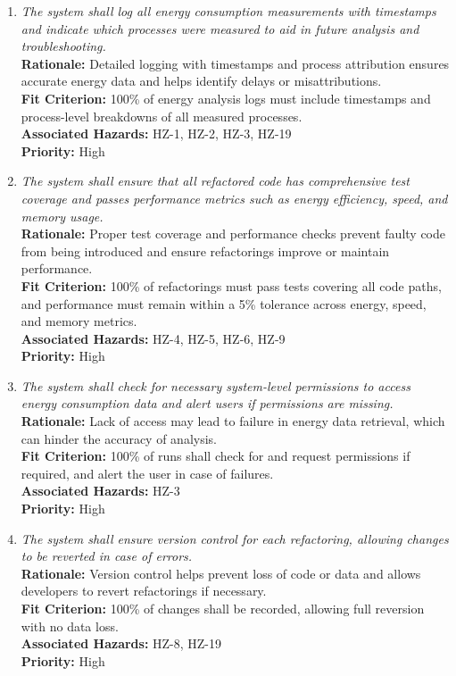 \documentclass{article}
\begin{document}
\begin{enumerate}[label=SCR \arabic*., wide=0pt, leftmargin=*]

    \item \emph{The system shall log all energy consumption measurements with timestamps and indicate which processes were measured to aid in future analysis and troubleshooting.}\\
    {\bf Rationale:} Detailed logging with timestamps and process attribution ensures accurate energy data and helps identify delays or misattributions.\\
    {\bf Fit Criterion:} 100\% of energy analysis logs must include timestamps and process-level breakdowns of all measured processes.\\
    {\bf Associated Hazards:} HZ-1, HZ-2, HZ-3, HZ-19\\
    {\bf Priority:} High

    \item \emph{The system shall ensure that all refactored code has comprehensive test coverage and passes performance metrics such as energy efficiency, speed, and memory usage.}\\
    {\bf Rationale:} Proper test coverage and performance checks prevent faulty code from being introduced and ensure refactorings improve or maintain performance.\\
    {\bf Fit Criterion:} 100\% of refactorings must pass tests covering all code paths, and performance must remain within a 5\% tolerance across energy, speed, and memory metrics.\\
    {\bf Associated Hazards:} HZ-4, HZ-5, HZ-6, HZ-9\\
    {\bf Priority:} High

    \item \emph{The system shall check for necessary system-level permissions to access energy consumption data and alert users if permissions are missing.}\\
    {\bf Rationale:} Lack of access may lead to failure in energy data retrieval, which can hinder the accuracy of analysis.\\
    {\bf Fit Criterion:} 100\% of runs shall check for and request permissions if required, and alert the user in case of failures.\\
    {\bf Associated Hazards:} HZ-3\\
    {\bf Priority:} High

    \item \emph{The system shall ensure version control for each refactoring, allowing changes to be reverted in case of errors.}\\
    {\bf Rationale:} Version control helps prevent loss of code or data and allows developers to revert refactorings if necessary.\\
    {\bf Fit Criterion:} 100\% of changes shall be recorded, allowing full reversion with no data loss.\\
    {\bf Associated Hazards:} HZ-8, HZ-19\\
    {\bf Priority:} High


\end{enumerate}
\end{document}
